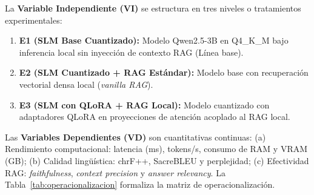 La \textbf{Variable Independiente (VI)} se estructura en tres niveles o tratamientos experimentales:
\begin{enumerate}
    \item \textbf{E1 (SLM Base Cuantizado):} Modelo Qwen2.5-3B en Q4\_K\_M bajo inferencia local sin inyección de contexto RAG (Línea base).
    \item \textbf{E2 (SLM Cuantizado + RAG Estándar):} Modelo base con recuperación vectorial densa local (\textit{vanilla RAG}).
    \item \textbf{E3 (SLM con QLoRA + RAG Local):} Modelo cuantizado con adaptadores QLoRA en proyecciones de atención acoplado al RAG local.
\end{enumerate}

Las \textbf{Variables Dependientes (VD)} son cuantitativas continuas: (a) Rendimiento computacional: latencia (ms), tokens/s, consumo de RAM y VRAM (GB); (b) Calidad lingüística: chrF++, SacreBLEU y perplejidad; (c) Efectividad RAG: \textit{faithfulness}, \textit{context precision} y \textit{answer relevancy}. La Tabla~\ref{tab:operacionalizacion} formaliza la matriz de operacionalización.

